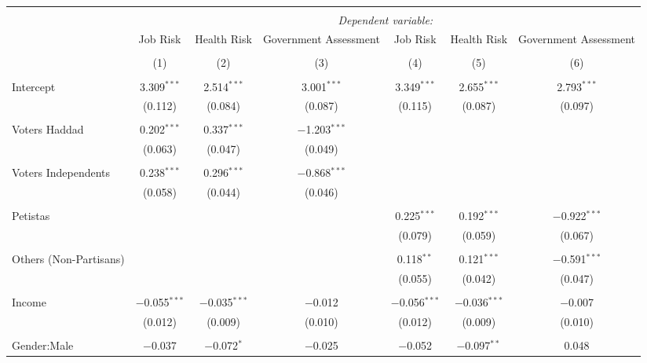
\begin{table}[!htbp] \centering 
  \caption{} 
  \label{} 
\begin{tabular}{@{\extracolsep{5pt}}lcccccc} 
\\[-1.8ex]\hline 
\hline \\[-1.8ex] 
 & \multicolumn{6}{c}{\textit{Dependent variable:}} \\ 
\cline{2-7} 
 & Job Risk & Health Risk & Government Assessment & Job Risk & Health Risk & Government Assessment \\ 
\\[-1.8ex] & (1) & (2) & (3) & (4) & (5) & (6)\\ 
\hline \\[-1.8ex] 
 Intercept & 3.309$^{***}$ & 2.514$^{***}$ & 3.001$^{***}$ & 3.349$^{***}$ & 2.655$^{***}$ & 2.793$^{***}$ \\ 
  & (0.112) & (0.084) & (0.087) & (0.115) & (0.087) & (0.097) \\ 
  & & & & & & \\ 
 Voters Haddad & 0.202$^{***}$ & 0.337$^{***}$ & $-$1.203$^{***}$ &  &  &  \\ 
  & (0.063) & (0.047) & (0.049) &  &  &  \\ 
  & & & & & & \\ 
 Voters Independents & 0.238$^{***}$ & 0.296$^{***}$ & $-$0.868$^{***}$ &  &  &  \\ 
  & (0.058) & (0.044) & (0.046) &  &  &  \\ 
  & & & & & & \\ 
 Petistas &  &  &  & 0.225$^{***}$ & 0.192$^{***}$ & $-$0.922$^{***}$ \\ 
  &  &  &  & (0.079) & (0.059) & (0.067) \\ 
  & & & & & & \\ 
 Others (Non-Partisans) &  &  &  & 0.118$^{**}$ & 0.121$^{***}$ & $-$0.591$^{***}$ \\ 
  &  &  &  & (0.055) & (0.042) & (0.047) \\ 
  & & & & & & \\ 
 Income & $-$0.055$^{***}$ & $-$0.035$^{***}$ & $-$0.012 & $-$0.056$^{***}$ & $-$0.036$^{***}$ & $-$0.007 \\ 
  & (0.012) & (0.009) & (0.010) & (0.012) & (0.009) & (0.010) \\ 
  & & & & & & \\ 
 Gender:Male & $-$0.037 & $-$0.072$^{*}$ & $-$0.025 & $-$0.052 & $-$0.097$^{**}$ & 0.048 \\ 

\end{tabular}
\end{table}
